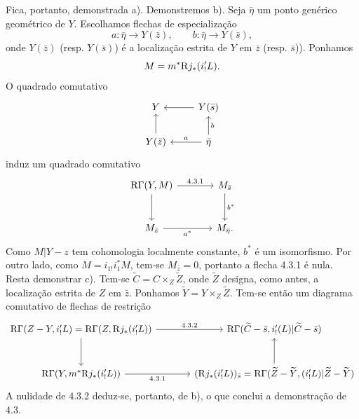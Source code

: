 Fica, portanto, demonstrada a). Demonstremos b). Seja $\bar\eta$ um ponto genérico geométrico de $Y$. Escolhamos flechas de especialização
\[
a:\bar\eta\to Y(\bar z),\qquad b:\bar\eta\to Y(\bar s),
\]
onde $Y(\bar z)$ (resp. $Y(\bar s)$) é a localização estrita de $Y$ em $\bar z$ (resp. $\bar s$)). Ponhamos
\[
M=m^*\mathrm{R} j_*(i'_!L).
\]
O quadrado comutativo
\[
\begin{tikzcd}
Y & Y(\bar s)\arrow[l]\\
Y(\bar z)\arrow[u] & \bar\eta \arrow[l,"a"']\arrow[u,"b"']
\end{tikzcd}
\]
induz um quadrado comutativo
\[
\begin{tikzcd}[column sep=large,row sep=large]
\R\Gamma(Y,M) \arrow[r,"4.3.1"] \arrow[d] & M_{\bar s} \arrow[d,"b^*"]\\
M_{\bar z} \arrow[r,"a^*"'] & M_{\bar\eta}.
\end{tikzcd}
\]
Como $M|Y-z$ tem cohomologia localmente constante, $b^*$ é um isomorfismo. Por outro lado, como $M=i_{1!}i_1^*M$, tem-se $M_{\bar z}=0$, portanto a flecha 4.3.1 é nula. Resta demonstrar c). Tem-se $\widetilde C=C\times_Z\widetilde Z$, onde $\widetilde Z$ designa, como antes, a localização estrita de $Z$ em $\bar z$. Ponhamos $\widetilde Y=Y\times_Z\widetilde Z$. Tem-se então um diagrama comutativo de flechas de restrição
\[
\begin{tikzcd}[column sep=large,row sep=large]
\R\Gamma(Z-Y,i'_!L)=\R\Gamma(Z,\R j_*(i'_!L))
 \arrow[r,"4.3.2"] \arrow[d]
&
\R\Gamma(\widetilde C-\bar s,i'_!(L)|\widetilde C-\bar s)\\
\R\Gamma(Y,m^*\R j_*(i'_!L)) \arrow[r,"4.3.1"']
&
(\R j_*(i'_!L))_{\bar s}
  =\R\Gamma(\widetilde Z-\widetilde Y,(i'_!L)|\widetilde Z-\widetilde Y) \arrow[u]
\end{tikzcd}
\]
A nulidade de 4.3.2 deduz-se, portanto, de b), o que conclui a demonstração de 4.3.
